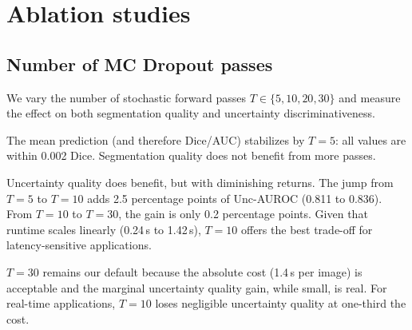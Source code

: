 \section{Ablation studies}
\label{sec:ablations}

\subsection{Number of MC Dropout passes}

We vary the number of stochastic forward passes $T \in \{5, 10, 20, 30\}$
and measure the effect on both segmentation quality and uncertainty
discriminativeness.

\begin{table}[H]
\centering
\caption{Effect of MC Dropout pass count $T$ on DRIVE test set. Dice
and AUC are nearly constant across $T$, confirming that the mean prediction
stabilizes quickly. Unc-AUROC increases from $T = 5$ to $T = 10$ and
plateaus after $T = 20$. Runtime scales linearly with $T$.}
\label{tab:mc_passes}
\small
\setlength{\tabcolsep}{4.6pt}
\end{table}

The mean prediction (and therefore Dice/AUC) stabilizes by $T = 5$: all
values are within 0.002 Dice. Segmentation quality does not benefit from
more passes.

Uncertainty quality does benefit, but with diminishing returns. The jump
from $T = 5$ to $T = 10$ adds 2.5 percentage points of Unc-AUROC (0.811
to 0.836). From $T = 10$ to $T = 30$, the gain is only 0.2 percentage
points. Given that runtime scales linearly (0.24\,s to 1.42\,s), $T = 10$
offers the best trade-off for latency-sensitive applications.

$T = 30$ remains our default because the absolute cost (1.4\,s per image)
is acceptable and the marginal uncertainty quality gain, while small, is
real. For real-time applications, $T = 10$ loses negligible uncertainty
quality at one-third the cost.

